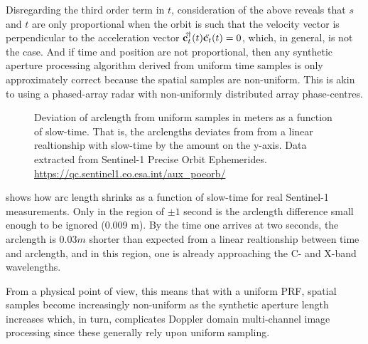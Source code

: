 Disregarding the third order term in $t$, consideration of the above reveals that $s$ and $t$ are only proportional when the orbit is such that the velocity vector is perpendicular to the acceleration vector $\hat{\dot{\mathbf{c}_t}}^\dagger(t)\ddot{\mathbf{c}_t}(t)=0$, which, in general, is not the case. And if time and position are not proportional, then any synthetic aperture processing algorithm derived from uniform time samples is only approximately correct because the spatial samples are non-uniform. This is akin to using a phased-array radar with non-uniformly distributed array phase-centres.
\begin{figure}
    \resizebox{\textwidth}{!}{}
	\caption{Deviation of arclength from uniform samples in meters as a function of slow-time. That is, the arclengths deviates from from a linear realtionship with slow-time by the amount on the y-axis. Data extracted from Sentinel-1 Precise Orbit Ephemerides. \url{https://qc.sentinel1.eo.esa.int/aux\_poeorb/}}
	\label{fg:ARCLengthError}
\end{figure}
\par
{} shows how arc length shrinks as a function of slow-time for real Sentinel-1 measurements. Only in the region of $\pm 1$ second is the arclength difference small enough to be ignored (0.009 m). By the time one arrives at two seconds, the arclength is $0.03 m$ shorter than expected from a linear realtionship between time and arclength, and in this region, one is already approaching the C- and X-band wavelengths.
\par
From a physical point of view, this means that with a uniform PRF, spatial samples become increasingly non-uniform as the synthetic aperture length increases which, in turn, complicates Doppler domain multi-channel image processing since these generally rely upon uniform sampling. 
